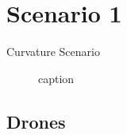 \section{Scenario 1}\label{sec:scenario1}
Curvature Scenario

\begin{figure}[H]
\hfill
{}
\hfill
{}
\hfill
\caption{caption}
\label{fig:topigraphic}
\end{figure}

\subsection{Drones}

